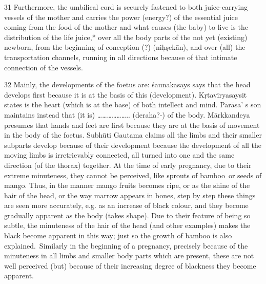 \begin{translation}
\begin{tt}
\item[31]Furthermore, the umbilical cord is securely fastened to both 
juice-carrying vessels of the mother and carries the power (energy?) of the 
essential juice coming from the food of the mother and what causes (the baby) to 
live is the distribution of the life juice,* over all the body parts of the not yet 
(existing) newborn, from the beginning of conception (?) (niḥṣekān), and over 
(all) the transportation channels, running in all directions because of that 
intimate connection of the vessels.

\item[32]Mainly, the developments of the foetus are: śaunakasays says that the 
head develops first because it is at the basis of this (development). 
Kṛtavīryasaysit states is the heart (which is at the base) of both intellect and 
mind. Pārāsa’ s son maintains instead that (it is) ……………….. (deraha?-) of the 
body. Mārkkandeya presumes that hands and feet are first because they are at 
the basis of movement in the body of the foetus. Subhūti Gautama claims all the 
limbs and their smaller subparts develop because of their development because 
the development of all the moving limbs is irretrievably connected, all turned 
into one and the same direction (of the thorax) together. At the time of early 
pregnancy, due to their extreme minuteness, they cannot be perceived, like 
sprouts of bamboo or seeds of mango. Thus, in the manner mango fruits 
becomes ripe, or as the shine of the hair of the head, or the way marrow appears 
in bones, step by step these things are seen more accurately, e.g. as an increase 
of black colour, and they become gradually apparent as the body (takes shape). 
Due to their feature of being so subtle, the minuteness of the hair of the head 
(and other examples) makes the black become apparent in this way; just so the 
growth of bamboo is also explained. Similarly in the beginning of a pregnancy, 
precisely  because of the minuteness in all limbs and smaller body parts which 
are present, these are not well perceived (but) because of their increasing 
degree of blackness they become apparent.


\end{tt}
\end{translation}
